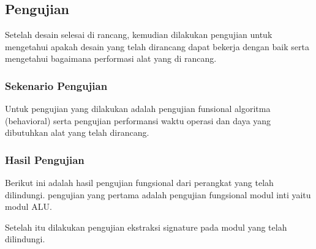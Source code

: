 \chapter{\babEmpat}

\section{Pengujian}
Setelah desain selesai di rancang, kemudian dilakukan pengujian untuk mengetahui apakah desain yang telah dirancang dapat bekerja dengan baik serta mengetahui bagaimana performasi alat yang di rancang.

\subsection{Sekenario Pengujian}
Untuk pengujian yang dilakukan adalah pengujian funsional algoritma (behavioral) serta pengujian performansi waktu operasi dan daya yang dibutuhkan alat yang telah dirancang.

\subsection{Hasil Pengujian}
Berikut ini adalah hasil pengujian fungsional dari perangkat yang telah dilindungi. pengujian yang pertama adalah pengujian fungsional  modul inti yaitu modul ALU.

Setelah itu dilakukan pengujian ekstraksi signature pada modul yang telah dilindungi.

